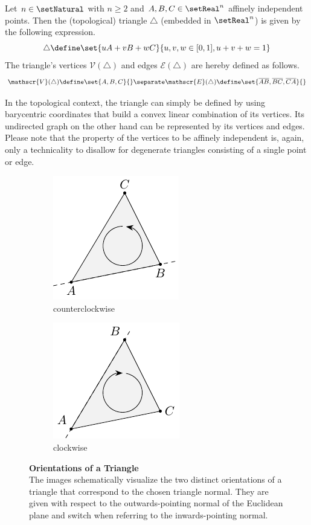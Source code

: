 \documentclass{stdlocal}
\begin{document}
  \begin{definition}[Triangle]
    Let $n\in\setNatural$ with $n\geq 2$ and $A,B,C\in\setReal^n$ affinely independent points.
    Then the (topological) triangle $\triangle$ (embedded in $\setReal^n$) is given by the following expression.
    \[
      \triangle \define \set{uA + vB + wC}{u,v,w\in[0,1], u+v+w=1}
    \]
    The triangle's vertices $\mathscr{V}(\triangle)$ and edges $\mathscr{E}(\triangle)$ are hereby defined as follows.
    \[
      \mathscr{V}(\triangle) \define \set{A,B,C}{}
      \separate
      \mathscr{E}(\triangle) \define \set{\overline{AB}, \overline{BC}, \overline{CA}}{}
    \]
  \end{definition}
  In the topological context, the triangle can simply be defined by using barycentric coordinates that build a convex linear combination of its vertices.
  Its undirected graph on the other hand can be represented by its vertices and edges.
  Please note that the property of the vertices to be affinely independent is, again, only a technicality to disallow for degenerate triangles consisting of a single point or edge.

  \begin{figure}
    \centering
    \begin{subfigure}[b]{0.49\linewidth}
      \centering
      \includegraphics[scale=0.9]{figures/triangle_counterclockwise.pdf}
      \caption{counterclockwise}
    \end{subfigure}
    \begin{subfigure}[b]{0.49\linewidth}
      \centering
      \includegraphics[scale=0.9]{figures/triangle_clockwise.pdf}
      \caption{clockwise}
    \end{subfigure}
    \caption[Orientations of a Triangle]{%
      \textbf{Orientations of a Triangle}\\
      The images schematically visualize the two distinct orientations of a triangle that correspond to the chosen triangle normal.
      They are given with respect to the outwards-pointing normal of the Euclidean plane and switch when referring to the inwards-pointing normal.
    }
    \label{fig:triangle-orientations}
  \end{figure}
\end{document}
